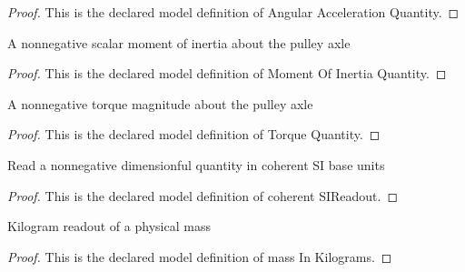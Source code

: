 \begin{proof}
  This is the declared model definition of Angular Acceleration Quantity.
\end{proof}
\begin{definition}
  \label{def:physics:phyx-mini-0778:phyxminiproblems-problemphyxmini0778-momentofinertiaquantity}
  A nonnegative scalar moment of inertia about the pulley axle
\end{definition}
\begin{proof}
  This is the declared model definition of Moment Of Inertia Quantity.
\end{proof}
\begin{definition}
  \label{def:physics:phyx-mini-0778:phyxminiproblems-problemphyxmini0778-torquequantity}
  A nonnegative torque magnitude about the pulley axle
\end{definition}
\begin{proof}
  This is the declared model definition of Torque Quantity.
\end{proof}
\begin{definition}
  \label{def:physics:phyx-mini-0778:phyxminiproblems-problemphyxmini0778-coherentsireadout}
  Read a nonnegative dimensionful quantity in coherent SI base units
\end{definition}
\begin{proof}
  This is the declared model definition of coherent SIReadout.
\end{proof}
\begin{definition}
  \label{def:physics:phyx-mini-0778:phyxminiproblems-problemphyxmini0778-massinkilograms}
  Kilogram readout of a physical mass
\end{definition}
\begin{proof}
  This is the declared model definition of mass In Kilograms.
\end{proof}
